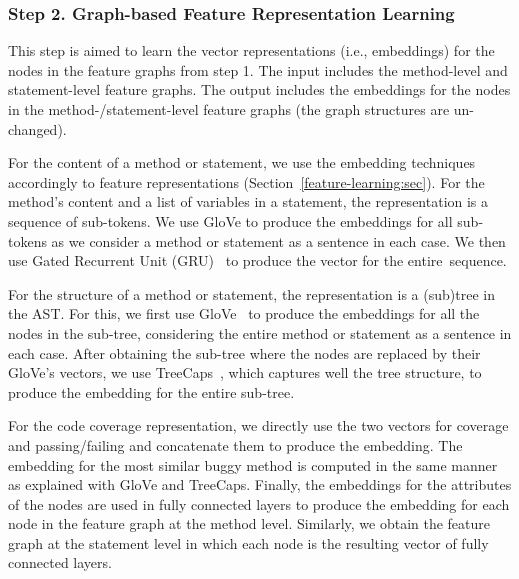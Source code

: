 

\subsubsection{{\bf Step 2. Graph-based Feature Representation
  Learning}}


This step is aimed to learn the vector
representations (i.e., embeddings) for the nodes in the feature graphs
from step 1. The input includes the method-level and statement-level
feature graphs. The output includes the embeddings for the nodes in
the method-/statement-level feature graphs (the graph structures are
un-changed).


For the content of a method or statement, we use the
embedding techniques accordingly to feature representations
(Section~\ref{feature-learning:sec}). For the method's content and a
list of variables in a statement, the representation is a sequence of
sub-tokens. We use GloVe \cite{glove2014} to produce the embeddings
for all sub-tokens as we consider a method or statement as a sentence
in each case. We then use Gated Recurrent Unit (GRU)~\cite{GRU-cho14}
to produce the vector for the entire~sequence.

For the structure of a method or statement, the representation is a
(sub)tree in the AST. For this, we first use GloVe~\cite{glove2014} to
produce the embeddings for all the nodes in the sub-tree, considering
the entire method or statement as a sentence in each case. After
obtaining the sub-tree where the nodes are replaced by their GloVe's
vectors, we use TreeCaps~\cite{bui2021treecaps}, which captures well
the tree structure, to produce the embedding for the entire sub-tree.

For the code coverage representation, we directly use the two vectors
for coverage and passing/failing and concatenate them to produce the
embedding. The embedding for the most similar buggy method is computed
in the same manner as explained with GloVe and TreeCaps. Finally, the
embeddings for the attributes of the nodes are used in fully connected
layers to produce the embedding for each node in the feature graph at
the method level. Similarly, we obtain the feature graph at the
statement level in which each node is the resulting vector of fully
connected layers.

